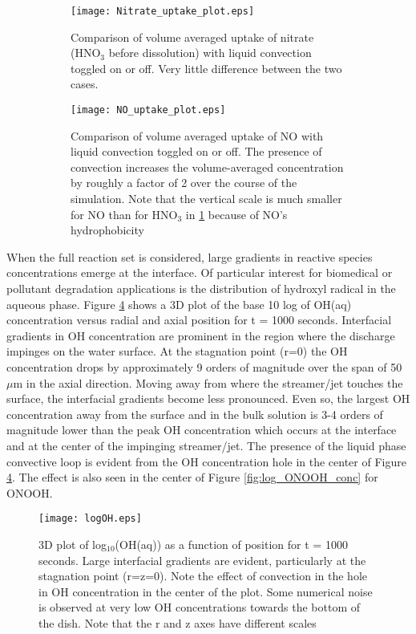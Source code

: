 \begin{figure}[htpb]
    \centering
    \begin{subfigure}[b]{.63\textwidth}
        \texttt{[image: Nitrate\_uptake\_plot.eps]}
        \caption{Comparison of volume averaged uptake of nitrate (HNO$_3$ before dissolution) with liquid convection toggled on or off. Very little difference between the two cases.}
        \label{fig:HNO3_mass_compare}
    \end{subfigure}
    \begin{subfigure}[b]{.63\textwidth}
        \texttt{[image: NO\_uptake\_plot.eps]}
        \caption{Comparison of volume averaged uptake of NO with liquid convection toggled on or off. The presence of convection increases the volume-averaged concentration by roughly a factor of 2 over the course of the simulation. Note that the vertical scale is much smaller for NO than for HNO$_3$ in \ref{fig:HNO3_mass_compare} because of NO's hydrophobicity}
        \label{fig:NO_mass_compare}
    \end{subfigure}
    \caption{}
    \label{fig:excel}
\end{figure}

When the full reaction set is considered, large gradients in reactive species concentrations emerge at the interface. Of particular interest for biomedical or pollutant degradation applications is the distribution of hydroxyl radical in the aqueous phase. Figure \ref{fig:log_OH_conc} shows a 3D plot of the base 10 log of OH(aq) concentration versus radial and axial position for t = 1000 seconds. Interfacial gradients in OH concentration are prominent in the region where the discharge impinges on the water surface. At the stagnation point (r=0) the OH concentration drops by approximately 9 orders of magnitude over the span of 50 $\mu$m in the axial direction. Moving away from where the streamer/jet touches the surface, the interfacial gradients become less pronounced. Even so, the largest OH concentration away from the surface and in the bulk solution is 3-4 orders of magnitude lower than the peak OH concentration which occurs at the interface and at the center of the impinging streamer/jet. The presence of the liquid phase convective loop is evident from the OH concentration hole in the center of Figure \ref{fig:log_OH_conc}. The effect is also seen in the center of Figure \ref{fig:log_ONOOH_conc} for ONOOH.

\begin{figure}[htb]
    \centering
    \texttt{[image: logOH.eps]}
    \caption{3D plot of log$_{10}$(OH(aq)) as a function of position for t = 1000 seconds. Large interfacial gradients are evident, particularly at the stagnation point (r=z=0). Note the effect of convection in the hole in OH concentration in the center of the plot. Some numerical noise is observed at very low OH concentrations towards the bottom of the dish. Note that the r and z axes have different scales}
    \label{fig:log_OH_conc}
\end{figure}

